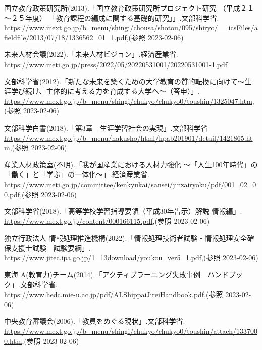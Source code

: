 \documentclass[11pt, a4paper]{jreport}
\renewcommand{\bibname}{参考文献}
\begin{document}
\begin{thebibliography}{9}
\addcontentsline{toc}{chapter}{\bibname}

 国立教育政策研究所(2013).「国立教育政策研究所プロジェクト研究 （平成２１～２５年度） 「教育課程の編成に関する基礎的研究」」.文部科学省.\\
\url{https://www.mext.go.jp/b_menu/shingi/chousa/shotou/095/shiryo/__icsFiles/afieldfile/2013/07/18/1336562_01_1.pdf},(参照 2023-02-06)

 未来人材会議(2022).「未来人材ビジョン」.経済産業省.\\
\url{https://www.meti.go.jp/press/2022/05/20220531001/20220531001-1.pdf}

 文部科学省(2012).「新たな未来を築くための大学教育の質的転換に向けて～生涯学び続け、主体的に考える力を育成する大学へ～（答申）」.\\ \url{https://www.mext.go.jp/b_menu/shingi/chukyo/chukyo0/toushin/1325047.htm},(参照 2023-02-06)

 文部科学白書(2018).「第3章　生涯学習社会の実現」.文部科学省\\
\url{https://www.mext.go.jp/b_menu/hakusho/html/hpab201901/detail/1421865.htm},(参照 2023-02-06)

 産業人材政策室(不明).「我が国産業における人材力強化 ～「人生100年時代」の「働く」と「学ぶ」の一体化～」.経済産業省.\\
\url{https://www.meti.go.jp/committee/kenkyukai/sansei/jinzairyoku/pdf/001_02_00.pdf},(参照 2023-02-06)

 文部科学省(2018).「高等学校学習指導要領（平成30年告示）解説 情報編」.\\
\url{https://www.mext.go.jp/content/000166115.pdf},(参照 2023-02-06)

 独立行政法人 情報処理推進機構(2022).「情報処理技術者試験・情報処理安全確保支援士試験　試験要綱」.\\ \url{https://www.jitec.ipa.go.jp/1_13download/youkou_ver5_1.pdf},(参照 2023-02-06)

 東海 A(教育力)チーム(2014).「アクティブラーニング失敗事例　ハンドブック」.文部科学省.\\ \url{https://www.hedc.mie-u.ac.jp/pdf/ALShippaiJireiHandbook.pdf},(参照 2023-02-06)

 中央教育審議会(2006).「教員をめぐる現状」.文部科学省.\\ \url{https://www.mext.go.jp/b_menu/shingi/chukyo/chukyo0/toushin/attach/1337000.htm},(参照 2023-02-06)


\end{thebibliography}
\end{document}
